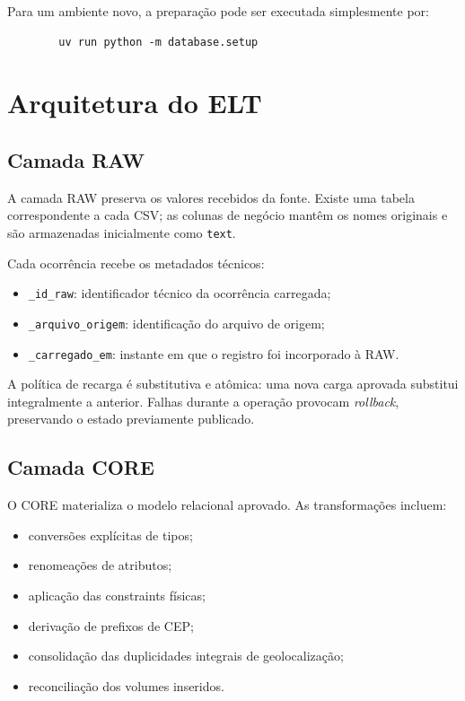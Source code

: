 \documentclass[12pt,a4paper]{article}
\begin{document}
	Para um ambiente novo, a preparação pode ser executada simplesmente por:
	
	\begin{verbatim}
		uv run python -m database.setup
	\end{verbatim}
	
	\section{Arquitetura do ELT}
	
	\subsection{Camada RAW}
	
	A camada RAW preserva os valores recebidos da fonte. Existe uma tabela
	correspondente a cada CSV; as colunas de negócio mantêm os nomes originais e
	são armazenadas inicialmente como \texttt{text}.
	
	Cada ocorrência recebe os metadados técnicos:
	
	\begin{itemize}[leftmargin=1.2cm]
		\item \texttt{\_id\_raw}: identificador técnico da ocorrência carregada;
		\item \texttt{\_arquivo\_origem}: identificação do arquivo de origem;
		\item \texttt{\_carregado\_em}: instante em que o registro foi incorporado à RAW.
	\end{itemize}
	
	A política de recarga é substitutiva e atômica: uma nova carga aprovada
	substitui integralmente a anterior. Falhas durante a operação provocam
	\textit{rollback}, preservando o estado previamente publicado.
	
	\subsection{Camada CORE}
	
	O CORE materializa o modelo relacional aprovado. As transformações incluem:
	
	\begin{itemize}[leftmargin=1.2cm]
		\item conversões explícitas de tipos;
		\item renomeações de atributos;
		\item aplicação das constraints físicas;
		\item derivação de prefixos de CEP;
		\item consolidação das duplicidades integrais de geolocalização;
		\item reconciliação dos volumes inseridos.
	\end{itemize}
	
\end{document}
